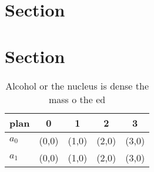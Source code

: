 \documentclass[a4paper]{article}
\begin{document}
\section{Section}

\section{Section}

\begin{table}
\begin{adjustbox}{width=0.7\columnwidth}
\begin{tabular}{|l|l|l|l|l|}
\hline
\textbf{plan} & \multicolumn{1}{c|}{\textbf{0}} & \multicolumn{1}{c|}{\textbf{1}} & \multicolumn{1}{c|}{\textbf{2}} & \multicolumn{1}{c|}{\textbf{3}} \\ \hline
\textbf{$a_0$}  & (0,0) & (1,0) & (2,0) & (3,0) \\ \hline
\textbf{$a_1$}  & (0,0) & (1,0) & (2,0) & (3,0) \\ \hline
\end{tabular}
\end{adjustbox}
\caption{Alcohol or the nucleus is dense the mass o the ed
}
\end{table}
\end{document}
